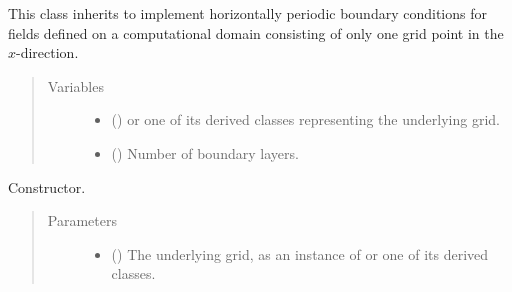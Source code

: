 \documentclass[letterpaper,10pt,english]{sphinxmanual}
\begin{document}

\begin{fulllineitems}
\label{\detokenize{api:tasmania.dycore.horizontal_boundary_periodic.PeriodicYZ}}
This class inherits {\hyperref[\detokenize{api:tasmania.dycore.horizontal_boundary.HorizontalBoundary}]{}} to implement horizontally
periodic boundary conditions for fields defined on a computational domain consisting of only one grid
point in the \(x\)-direction.
\begin{quote}\begin{description}
\item[{Variables}] \leavevmode\begin{itemize}
\item {} 
 () \textendash{} {\hyperref[\detokenize{api:tasmania.grids.grid_xyz.GridXYZ}]{}} or one of its derived classes representing the underlying grid.

\item {} 
{\hyperref[\detokenize{api:tasmania.dycore.prognostic_isentropic.PrognosticIsentropic.nb}]{}} () \textendash{} Number of boundary layers.

\end{itemize}

\end{description}\end{quote}

\begin{fulllineitems}
\label{\detokenize{api:tasmania.dycore.horizontal_boundary_periodic.PeriodicYZ.__init__}}
Constructor.
\begin{quote}\begin{description}
\item[{Parameters}] \leavevmode\begin{itemize}
\item {} 
 () \textendash{} The underlying grid, as an instance of {\hyperref[\detokenize{api:tasmania.grids.grid_xyz.GridXYZ}]{}} or one of its derived classes.


\end{itemize}
\end{description}
\end{quote}
\end{fulllineitems}
\end{fulllineitems}
\end{document}

